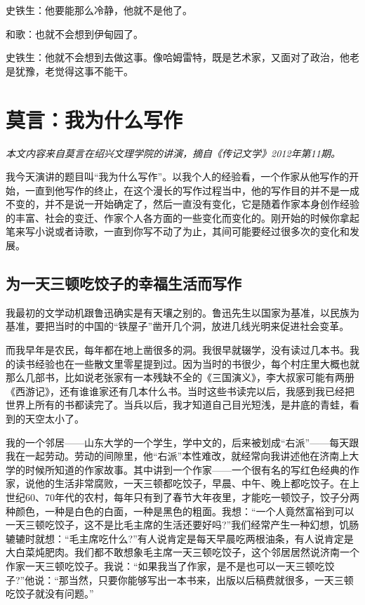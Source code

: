 \documentclass[fontset=fandol,12pt,a5paper]{ctexbook}
\begin{document}
史铁生：他要能那么冷静，他就不是他了。

和歌：也就不会想到伊甸园了。

史铁生：他就不会想到去做这事。像哈姆雷特，既是艺术家，又面对了政治，他老是犹豫，老觉得这事不能干。

\newpage

\section{莫言：我为什么写作}
\emph{本文内容来自莫言在绍兴文理学院的讲演，摘自《传记文学》2012年第11期。}
\vspace{2em}

我今天演讲的题目叫“我为什么写作”。以我个人的经验看，一个作家从他写作的开始，一直到他写作的终止，在这个漫长的写作过程当中，他的写作目的并不是一成不变的，并不是说一开始确定了，然后一直没有变化，它是随着作家本身创作经验的丰富、社会的变迁、作家个人各方面的一些变化而变化的。刚开始的时候你拿起笔来写小说或者诗歌，一直到你写不动了为止，其间可能要经过很多次的变化和发展。

\subsection{为一天三顿吃饺子的幸福生活而写作}

我最初的文学动机跟鲁迅确实是有天壤之别的。鲁迅先生以国家为基准，以民族为基准，要把当时的中国的“铁屋子”凿开几个洞，放进几线光明来促进社会变革。

而我早年是农民，每年都在地上凿很多的洞。我很早就辍学，没有读过几本书。我的读书经验也在一些散文里零星提到过。因为当时的书很少，每个村庄里大概也就那么几部书，比如说老张家有一本残缺不全的《三国演义》，李大叔家可能有两册《西游记》，还有谁谁家还有几本什么书。当时这些书读完以后，我感到我已经把世界上所有的书都读完了。当兵以后，我才知道自己目光短浅，是井底的青蛙，看到的天空太小了。

我的一个邻居——山东大学的一个学生，学中文的，后来被划成“右派”——每天跟我在一起劳动。劳动的间隙里，他“右派”本性难改，就经常向我讲述他在济南上大学的时候所知道的作家故事。其中讲到一个作家——一个很有名的写红色经典的作家，说他的生活非常腐败，一天三顿都吃饺子，早晨、中午、晚上都吃饺子。在上世纪60、70年代的农村，每年只有到了春节大年夜里，才能吃一顿饺子，饺子分两种颜色，一种是白色的白面，一种是黑色的粗面。我想：“一个人竟然富裕到可以一天三顿吃饺子，这不是比毛主席的生活还要好吗?”我们经常产生一种幻想，饥肠辘辘时就想：“毛主席吃什么?”有人说肯定是每天早晨吃两根油条，有人说肯定是大白菜炖肥肉。我们都不敢想象毛主席一天三顿吃饺子，这个邻居居然说济南一个作家一天三顿吃饺子。我说：“如果我当了作家，是不是也可以一天三顿吃饺子?”他说：“那当然，只要你能够写出一本书来，出版以后稿费就很多，一天三顿吃饺子就没有问题。”
\end{document}
